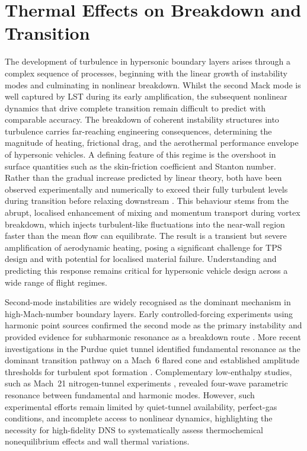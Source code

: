 \chapter{Thermal Effects on Breakdown and Transition}\label{chapter:breakdown}

The development of turbulence in hypersonic boundary layers arises through a complex sequence of processes, beginning with the linear growth of instability modes and culminating in nonlinear breakdown. Whilst the second Mack mode is well captured by \gls{LST} during its early amplification, the subsequent nonlinear dynamics that drive complete transition remain difficult to predict with comparable accuracy. The breakdown of coherent instability structures into turbulence carries far-reaching engineering consequences, determining the magnitude of heating, frictional drag, and the aerothermal performance envelope of hypersonic vehicles. A defining feature of this regime is the overshoot in surface quantities such as the skin-friction coefficient and Stanton number. Rather than the gradual increase predicted by linear theory, both have been observed experimentally and numerically to exceed their fully turbulent levels during transition before relaxing downstream \citep{Holden1972}. This behaviour stems from the abrupt, localised enhancement of mixing and momentum transport during vortex breakdown, which injects turbulent-like fluctuations into the near-wall region faster than the mean flow can equilibrate. The result is a transient but severe amplification of aerodynamic heating, posing a significant challenge for \gls{TPS} design and with potential for localised material failure. Understanding and predicting this response remains critical for hypersonic vehicle design across a wide range of flight regimes.

Second-mode instabilities are widely recognised as the dominant mechanism in high-Mach-number boundary layers. Early controlled-forcing experiments using harmonic point sources confirmed the second mode as the primary instability and provided evidence for subharmonic resonance as a breakdown route \citep{Shiplyuk2003,Bountin2008}. More recent investigations in the Purdue quiet tunnel identified fundamental resonance as the dominant transition pathway on a Mach~6 flared cone \citep{Chynoweth2014} and established amplitude thresholds for turbulent spot formation \citep{Casper2011,Casper2012}. Complementary low-enthalpy studies, such as Mach~21 nitrogen-tunnel experiments \citep{Mironov2000}, revealed four-wave parametric resonance between fundamental and harmonic modes. However, such experimental efforts remain limited by quiet-tunnel availability, perfect-gas conditions, and incomplete access to nonlinear dynamics, highlighting the necessity for high-fidelity \gls{DNS} to systematically assess thermochemical nonequilibrium effects and wall thermal variations.

